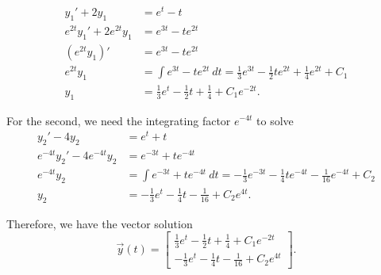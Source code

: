 \documentclass{ximera}
\begin{document}
\begin{exampleSol}
\begin{equation*}
    \begin{split}
        y_1' + 2y_1 &= e^t - t \\
        e^{2t}y_1' + 2e^{2t}y_1 &= e^{3t} - te^{2t} \\
        (e^{2t}y_1)' &= e^{3t} - te^{2t} \\
        e^{2t}y_1 &= \int e^{3t} - te^{2t}\ dt = \frac{1}{3}e^{3t} - \frac{1}{2}te^{2t} + \frac{1}{4}e^{2t} + C_1 \\
        y_1 &= \frac{1}{3}e^t - \frac{1}{2} t + \frac{1}{4} + C_1e^{-2t}.
    \end{split}
\end{equation*}

For the second, we need the integrating factor $e^{-4t}$ to solve
\begin{equation*}
    \begin{split}
        y_2' - 4y_2 &= e^t + t \\
        e^{-4t}y_2' - 4e^{-4t}y_2 &= e^{-3t} + te^{-4t} \\
        e^{-4t}y_2 &= \int e^{-3t} + te^{-4t}\ dt = -\frac{1}{3}e^{-3t} - \frac{1}{4}te^{-4t} - \frac{1}{16}e^{-4t} + C_2 \\
        y_2 &= -\frac{1}{3}e^{t} - \frac{1}{4}t - \frac{1}{16} + C_2e^{4t}. 
    \end{split}
\end{equation*}

Therefore, we have the vector solution
\begin{equation*}
    \vec{y}(t) = 
    \begin{bmatrix} 
        \frac{1}{3}e^t - \frac{1}{2} t + \frac{1}{4} + C_1e^{-2t} \\
        -\frac{1}{3}e^{t} - \frac{1}{4}t - \frac{1}{16} + C_2e^{4t}
    \end{bmatrix}. 
\end{equation*}


\end{exampleSol}
\end{document}
